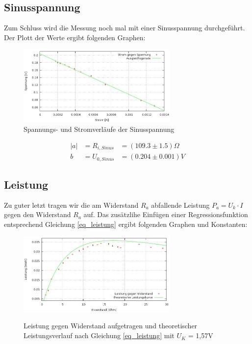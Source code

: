 \subsection{Sinusspannung}
Zum Schluss wird die Messung noch mal mit einer Sinusspannung durchgeführt. Der Plott der Werte ergibt folgenden Graphen:
\begin{figure}[H]
\includegraphics[width=0.7\textwidth]{pics/sinus.jpeg}
\caption{Spannungs- und Stromverläufe der Sinusspannung}
\end{figure}
\begin{align*}
|a| &= R_{i,Sinus}   &= (109.3    \pm 1.5) \Omega\\
b &= U_{0, Sinus} &= (0.204 \pm 0.001) V
\end{align*}

\subsection{Leistung}
Zu guter letzt tragen wir die am Widerstand $R_a$ abfallende Leistung $P_a = U_k \cdot I$ gegen den Widerstand $R_a$ auf. Das zusätzlihe Einfügen einer Regressionsfunktion entsprechend Gleichung \ref{eq_leistung} ergibt folgenden Graphen und Konstanten:

\begin{figure}[htbp]
\includegraphics[width=0.7\textwidth]{pics/leistung.jpeg}
\label{pic_leistung}
\caption{Leistung gegen Widerstand aufgetragen und theoretischer Leistungsverlauf nach Gleichung \eqref{eq_leistung} mit $U_K$ = 1,57V}
\end{figure}

